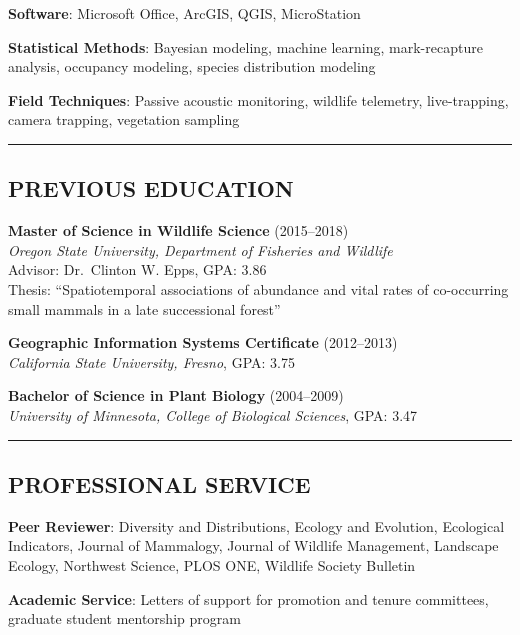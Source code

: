 \documentclass[
  11pt,
  letterpaper,
  DIV=11,
  numbers=noendperiod]{scrartcl}
\begin{document}
\textbf{Software}: Microsoft Office, ArcGIS, QGIS, MicroStation

\textbf{Statistical Methods}: Bayesian modeling, machine learning,
mark-recapture analysis, occupancy modeling, species distribution
modeling

\textbf{Field Techniques}: Passive acoustic monitoring, wildlife
telemetry, live-trapping, camera trapping, vegetation sampling

\begin{center}\rule{0.5\linewidth}{0.5pt}\end{center}

\subsection{PREVIOUS EDUCATION}\label{previous-education}

\textbf{Master of Science in Wildlife Science} (2015--2018)\\
\emph{Oregon State University, Department of Fisheries and Wildlife}\\
Advisor: Dr.~Clinton W. Epps, GPA: 3.86\\
Thesis: ``Spatiotemporal associations of abundance and vital rates of
co-occurring small mammals in a late successional forest''

\textbf{Geographic Information Systems Certificate} (2012--2013)\\
\emph{California State University, Fresno}, GPA: 3.75

\textbf{Bachelor of Science in Plant Biology} (2004--2009)\\
\emph{University of Minnesota, College of Biological Sciences}, GPA:
3.47

\begin{center}\rule{0.5\linewidth}{0.5pt}\end{center}

\subsection{PROFESSIONAL SERVICE}\label{professional-service}

\textbf{Peer Reviewer}: Diversity and Distributions, Ecology and
Evolution, Ecological Indicators, Journal of Mammalogy, Journal of
Wildlife Management, Landscape Ecology, Northwest Science, PLOS ONE,
Wildlife Society Bulletin

\textbf{Academic Service}: Letters of support for promotion and tenure
committees, graduate student mentorship program
\end{document}
